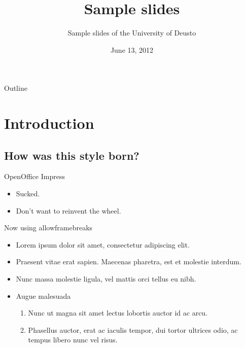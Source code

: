 \documentclass{beamer} %
\title{Sample slides}
\subtitle{Sample slides of the University of Deusto}
\institute{DeustoTech - Deusto Institute of Technology, University of Deusto
\url{http://www.morelab.deusto.es}}
\date{June 13, 2012}
\begin{document}
  \setSubjectColor[green]
  \owntitlepage

  \begin{frame}{Outline}
    \transwipe
  \end{frame}

\section{Introduction}
  \subsection{How was this style born?}
  \begin{frame}{OpenOffice Impress}
    \begin{itemize}
	\item Sucked.
	\pause
	\item Don't want to reinvent the wheel.
    \end{itemize}
  \end{frame}

  \begin{frame}[allowframebreaks]{Now using allowframebreaks}
    \begin{itemize}
      \item Lorem ipsum dolor sit amet, consectetur adipiscing elit.
      \item Praesent vitae erat sapien. Maecenas pharetra, est et molestie interdum.
      \item Nunc massa molestie ligula, vel mattis orci tellus eu nibh.
      \framebreak
      \item Augue malesuada
      \begin{enumerate}
	  \item Nunc ut magna sit amet lectus lobortis auctor id ac arcu.
	  \item Phasellus auctor, erat ac iaculis tempor, dui tortor ultrices odio, ac tempus libero nunc vel risus.
	\end{enumerate}
    \end{itemize}
  \end{frame}

\end{document}
